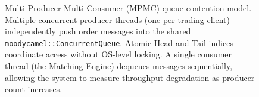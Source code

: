 \begin{figure}[H]
{%
    }
    \caption{Multi-Producer Multi-Consumer (MPMC) queue contention model.
    Multiple concurrent producer threads (one per trading client) 
    independently push order messages into the shared 
    \texttt{moodycamel::ConcurrentQueue}.
    Atomic Head and Tail indices coordinate access without 
    OS-level locking.
    A single consumer thread (the Matching Engine) dequeues 
    messages sequentially, allowing the system to measure 
    throughput degradation as producer count increases.}
    \label{fig:mpmc_contention}
\end{figure}
